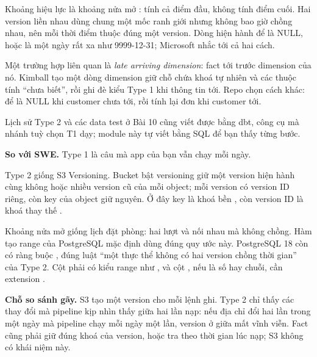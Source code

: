 Khoảng hiệu lực là khoảng nửa mở \code{[valid\_\allowbreak{}from, valid\_\allowbreak{}to)}: tính cả điểm đầu, không tính điểm cuối. Hai version liền nhau dùng chung một mốc ranh giới nhưng không bao giờ chồng nhau, nên mỗi thời điểm thuộc đúng một version. Dòng hiện hành để  là NULL, hoặc là một ngày rất xa như 9999-12-31; Microsoft nhắc tới cả hai cách.

Một trường hợp liên quan là \textit{late arriving dimension}: fact tới trước dimension của nó. Kimball tạo một dòng dimension giữ chỗ chứa khoá tự nhiên và các thuộc tính ``chưa biết'', rồi ghi đè kiểu Type 1 khi thông tin tới. Repo  chọn cách khác:  để  là NULL khi customer chưa tới, rồi tính lại đơn khi customer tới.

Lịch sử Type 2 và các data test ở Bài 10 cũng viết được bằng dbt, công cụ mà nhánh tuỳ chọn T1 dạy; module này tự viết bằng SQL để bạn thấy từng bước.

\begin{ghichu}
\textbf{So với SWE.} Type 1 là câu  mà app của bạn vẫn chạy mỗi ngày.

Type 2 giống S3 Versioning. Bucket bật versioning giữ một version hiện hành cùng không hoặc nhiều version cũ của mỗi object; mỗi version có version ID riêng, còn key của object giữ nguyên. Ở đây key là khoá bền , còn version ID là khoá thay thế .

Khoảng nửa mở giống lịch đặt phòng: hai lượt \code{[14:30, 15:30)} và \code{[15:30, 16:30)} nối nhau mà không chồng. Hàm tạo range của PostgreSQL mặc định dùng đúng quy ước này. PostgreSQL 18 còn có ràng buộc , đúng luật ``một thực thể không có hai version chồng thời gian'' của Type 2. Cột  phải có kiểu range như , và cột , nếu là số hay chuỗi, cần extension .

\textbf{Chỗ so sánh gãy.} S3 tạo một version cho mỗi lệnh ghi. Type 2 chỉ thấy các thay đổi mà pipeline kịp nhìn thấy giữa hai lần nạp: nếu địa chỉ đổi hai lần trong một ngày mà pipeline chạy mỗi ngày một lần, version ở giữa mất vĩnh viễn. Fact cũng phải giữ đúng khoá của version, hoặc tra theo thời gian lúc nạp; S3 không có khái niệm này.
\end{ghichu}

